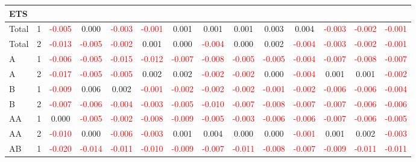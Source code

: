 \begin{table}[H]
{\begin{tabular}{llcccccccccccc}
\hline
ETS &  &  &  &  &  &  &  &  &  &  &  &  & \\
\hline
Total & 1 & \textcolor{red}{-0.005} & 0.000 & \textcolor{red}{-0.003} & \textcolor{red}{-0.001} & 0.001 & 0.001 & 0.001 & 0.003 & 0.004 & \textcolor{red}{-0.003} & \textcolor{red}{-0.002} & \textcolor{red}{-0.001}\\
Total & 2 & \textcolor{red}{-0.013} & \textcolor{red}{-0.005} & \textcolor{red}{-0.002} & 0.001 & 0.000 & \textcolor{red}{-0.004} & 0.000 & 0.002 & \textcolor{red}{-0.004} & \textcolor{red}{-0.003} & \textcolor{red}{-0.002} & \textcolor{red}{-0.001}\\
A & 1 & \textcolor{red}{-0.006} & \textcolor{red}{-0.005} & \textcolor{red}{-0.015} & \textcolor{red}{-0.012} & \textcolor{red}{-0.007} & \textcolor{red}{-0.008} & \textcolor{red}{-0.005} & \textcolor{red}{-0.005} & \textcolor{red}{-0.004} & \textcolor{red}{-0.007} & \textcolor{red}{-0.008} & \textcolor{red}{-0.007}\\
A & 2 & \textcolor{red}{-0.017} & \textcolor{red}{-0.005} & \textcolor{red}{-0.005} & 0.002 & 0.002 & \textcolor{red}{-0.002} & \textcolor{red}{-0.002} & 0.000 & \textcolor{red}{-0.004} & 0.001 & 0.001 & \textcolor{red}{-0.002}\\
B & 1 & \textcolor{red}{-0.009} & 0.006 & 0.002 & \textcolor{red}{-0.001} & \textcolor{red}{-0.002} & \textcolor{red}{-0.002} & \textcolor{red}{-0.002} & \textcolor{red}{-0.001} & \textcolor{red}{-0.002} & \textcolor{red}{-0.006} & \textcolor{red}{-0.006} & \textcolor{red}{-0.004}\\
B & 2 & \textcolor{red}{-0.007} & \textcolor{red}{-0.006} & \textcolor{red}{-0.004} & \textcolor{red}{-0.003} & \textcolor{red}{-0.005} & \textcolor{red}{-0.010} & \textcolor{red}{-0.007} & \textcolor{red}{-0.008} & \textcolor{red}{-0.007} & \textcolor{red}{-0.007} & \textcolor{red}{-0.006} & \textcolor{red}{-0.006}\\
AA & 1 & 0.000 & \textcolor{red}{-0.005} & \textcolor{red}{-0.002} & \textcolor{red}{-0.008} & \textcolor{red}{-0.009} & \textcolor{red}{-0.005} & \textcolor{red}{-0.003} & \textcolor{red}{-0.006} & \textcolor{red}{-0.006} & \textcolor{red}{-0.007} & \textcolor{red}{-0.006} & \textcolor{red}{-0.005}\\
AA & 2 & \textcolor{red}{-0.010} & 0.000 & \textcolor{red}{-0.006} & \textcolor{red}{-0.003} & 0.001 & 0.004 & 0.000 & 0.000 & \textcolor{red}{-0.001} & 0.001 & 0.002 & \textcolor{red}{-0.003}\\
AB & 1 & \textcolor{red}{-0.020} & \textcolor{red}{-0.014} & \textcolor{red}{-0.011} & \textcolor{red}{-0.010} & \textcolor{red}{-0.009} & \textcolor{red}{-0.007} & \textcolor{red}{-0.011} & \textcolor{red}{-0.008} & \textcolor{red}{-0.007} & \textcolor{red}{-0.009} & \textcolor{red}{-0.011} & \textcolor{red}{-0.011}\\

\end{tabular}}
\end{table}
